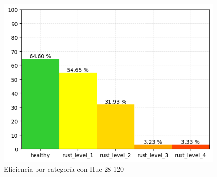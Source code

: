 \begin{figure}
\centering
\includegraphics[scale=0.6]{images/result_classes_28_120.png}
\caption{Eficiencia por categoría con Hue 28-120}
\label{img:efficiency_categories_28_120}
\end{figure}
